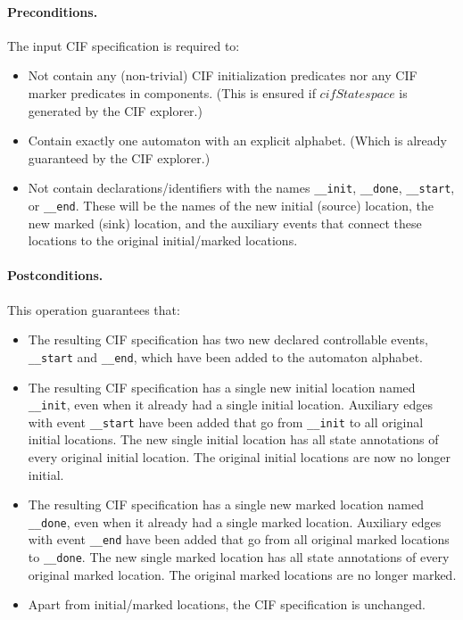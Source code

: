 \documentclass{article}
\newcommand{\var}[1]{\ensuremath{\mathit{#1}}}
\newcommand{\doneLabel}[0]{\texttt{\_\_done}}
\newcommand{\initLabel}[0]{\texttt{\_\_init}}
\newcommand{\startLabel}[0]{\texttt{\_\_start}}
\newcommand{\stopLabel}[0]{\texttt{\_\_end}} %
\theoremstyle{definition}
\begin{document}
\paragraph{Preconditions.}
The input CIF specification is required to:
\begin{itemize}
	\item Not contain any (non-trivial) CIF initialization predicates nor any CIF marker predicates in components.
	(This is ensured if \var{cifStatespace} is generated by the CIF explorer.)
	\item Contain exactly one automaton with an explicit alphabet.
	(Which is already guaranteed by the CIF explorer.)
	\item Not contain declarations/identifiers with the names \initLabel{}, \doneLabel{}, \startLabel{}, or \stopLabel{}.
	These will be the names of the new initial (source) location, the new marked (sink) location, and the auxiliary events that connect these locations to the original initial/marked locations.
\end{itemize}

\paragraph{Postconditions.}
This operation guarantees that:
\begin{itemize}
	\item The resulting CIF specification has two new declared controllable events, \startLabel{} and \stopLabel{}, which have been added to the automaton alphabet.
	\item The resulting CIF specification has a single new initial location named \initLabel{}, even when it already had a single initial location.
	Auxiliary edges with event \startLabel{} have been added that go from \initLabel{} to all original initial locations.
	The new single initial location has all state annotations of every original initial location.
	The original initial locations are now no longer initial.
	\item The resulting CIF specification has a single new marked location named \doneLabel{}, even when it already had a single marked location.
	Auxiliary edges with event \stopLabel{} have been added that go from all original marked locations to \doneLabel{}.
	The new single marked location has all state annotations of every original marked location.
	The original marked locations are no longer marked.
	\item Apart from initial/marked locations, the CIF specification is unchanged.
\end{itemize}
\end{document}
